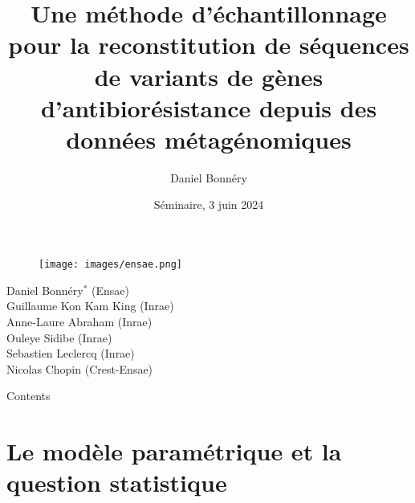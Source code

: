 \documentclass{beamer}
\author[Daniel Bonnéry]{Daniel Bonnéry}
\institute[]{}
\title[Reconstitution de séquences de variants ]{Une méthode d’échantillonnage pour la reconstitution de séquences de variants de gènes d'antibiorésistance depuis des données métagénomiques}
\date[2024/09/30]{Séminaire, \small 3 juin 2024}
\newcommand{\fr}[1]{#1}
\newcommand{\en}[1]{}
\begin{document}
{


\begin{frame}\label{start}
    \titlepage
        
    \begin{figure}
            \texttt{[image: images/ensae.png]} 
    \end{figure}
\end{frame}
}
\begin{frame}
        Daniel Bonnéry$^*$ (Ensae)\\
        Guillaume Kon Kam King (Inrae)\\
        Anne-Laure Abraham (Inrae)\\
	Ouleye Sidibe (Inrae)\\
	Sebastien Leclercq (Inrae)\\
        Nicolas Chopin (Crest-Ensae)
\end{frame}
\begin{frame}{Contents}
    \tableofcontents[sectionstyle=show, subsectionstyle=show/shaded/hide, subsubsectionstyle=show/shaded/hide]
\end{frame}

\section{\fr{Le modèle paramétrique et la question statistique}\en{The parametric model and the statistical question}}
\end{document}
